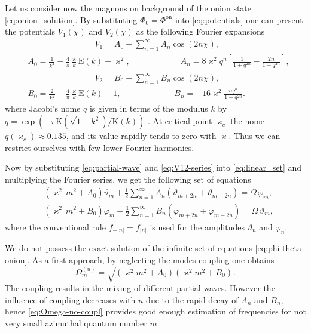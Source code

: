 \documentclass[showpacs,amsmath,amssymb,aps,pra,longbibliography,
10pt,preprint,superscriptaddress,showkeys]{revtex4-1}
\begin{document}
Let us consider now the magnons on background of the onion state \eqref{eq:onion_solution}. By substituting $\Phi _0=\Phi ^\mathrm{on}$ into \eqref{eq:potentials} one can present the potentials $V_1(\chi )$ and $V_2(\chi )$ as the following Fourier expansions \cite{NIST10}
\begin{equation} \label{eq:V12-series}
	\begin{split}
		&\qquad \qquad \qquad \qquad V_1=A_0+\sum\limits_{n=1}^\infty A_n\cos(2n\chi ), \\
		&A_0=\frac{1}{k^2}-\frac{4}{\pi }\frac{\varkappa }{k}\mathrm{E}(k)+\varkappa ^2, \qquad \qquad \qquad A_n=8\varkappa ^2q^n\left[\frac{1}{1+q^{2n}}-\frac{2n}{1-q^{2n}}\right],\\ 
		&\qquad \qquad \qquad \qquad V_2=B_0+\sum\limits_{n=1}^\infty B_n\cos(2n\chi ),\\
		&B_0=\frac{2}{k^2}-\frac{4}{\pi }\frac{\varkappa }{k}\mathrm{E}(k)-1, \qquad \qquad \qquad \, \, B_n=-16\varkappa ^2\frac{nq^n}{1-q^{2n}}.
	\end{split}
\end{equation}
where Jacobi's nome $q$ is given in terms of the modulus $k$ by $q=\exp\left(-\pi \mathrm{K}(\sqrt{1-k^2})/\mathrm{K}(k)\right)$ \cite{NIST10}. At critical point $\varkappa _c$ the nome $q(\varkappa _c)\approx 0.135$, and its value rapidly tends to zero with $\varkappa $. Thus we can restrict ourselves with few lower Fourier harmonics.

Now by substituting \eqref{eq:partial-wave} and \eqref{eq:V12-series} into \eqref{eq:linear_set} and multiplying the Fourier series, we get the following set of equations
\begin{equation} \label{eq:phi-theta-onion}
	\begin{split}
		&(\varkappa^2 \, m^2+A_0)\vartheta _m+\frac12\sum\limits_{n=1}^\infty A_n(\vartheta _{m+2n}+\vartheta _{m-2n}) = \Omega \, \varphi _m,\\
		&(\varkappa^2 \, m^2+B_0)\varphi _m+\frac12\sum\limits_{n=1}^\infty B_n(\varphi _{m+2n}+\varphi _{m-2n}) = \Omega \, \vartheta _m,	
	\end{split}
\end{equation}
where the conventional rule $f_{-|n|}=f_{|n|}$ is used for the amplitudes $\vartheta _{n}$ and $\varphi _{n}$.

We do not possess the exact solution of the infinite set of equations \eqref{eq:phi-theta-onion}. As a first approach, by neglecting the modes coupling one obtains
\begin{equation} \label{eq:Omega-no-coupl}
\Omega _m^{(u)} = \sqrt{(\varkappa ^2m^2+A_0)(\varkappa ^2m^2+B_0)}.
\end{equation}
The coupling results in the mixing of different partial waves. However the influence of coupling decreases with $n$ due to the rapid decay of $A_n$ and $B_n$, hence \eqref{eq:Omega-no-coupl} provides good enough estimation of frequencies for not very small azimuthal quantum number $m$.
\end{document}
